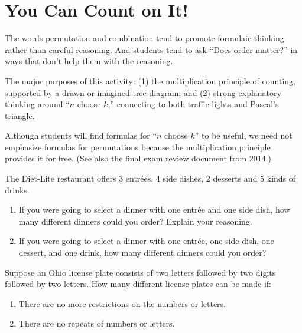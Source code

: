 \newpage
\section{You Can Count on It!}\label{A:countOnIt}
\begin{teachingnote}
 The words permutation and combination tend to promote formulaic thinking rather than careful reasoning.  And students tend to ask ``Does order matter?'' in ways that don't help them with the reasoning. 

The major purposes of this activity: (1) the multiplication principle of counting, supported by a drawn or imagined tree diagram; and (2) strong explanatory thinking around ``$n$ choose $k$,'' connecting to both traffic lights and Pascal's triangle.  

Although students will find formulas for ``$n$ choose $k$'' to be useful, we need not emphasize formulas for permutations because the multiplication principle provides it for free.   (See also the final exam review document from 2014.)
\end{teachingnote}

\begin{prob}
The Diet-Lite restaurant offers 3 entr\'ees, 4 side dishes, 2 desserts
and 5 kinds of drinks.  
\begin{enumerate}
\item If you were going to select a dinner with one
entr\'ee and one side dish, how many different dinners could you order?  Explain your reasoning.  
\item If you were going to select a dinner with one
entr\'ee, one side dish, one dessert, and one drink, how many different
dinners could you order?
\end{enumerate}
\end{prob}

\begin{prob}
Suppose an Ohio license plate consists of two letters followed by two
digits followed by two letters.  How many different
license plates can be made if: 
\begin{enumerate}
\item There are no more restrictions on the
numbers or letters.
\item  There are no repeats of numbers or letters.
\end{enumerate}
\end{prob}

